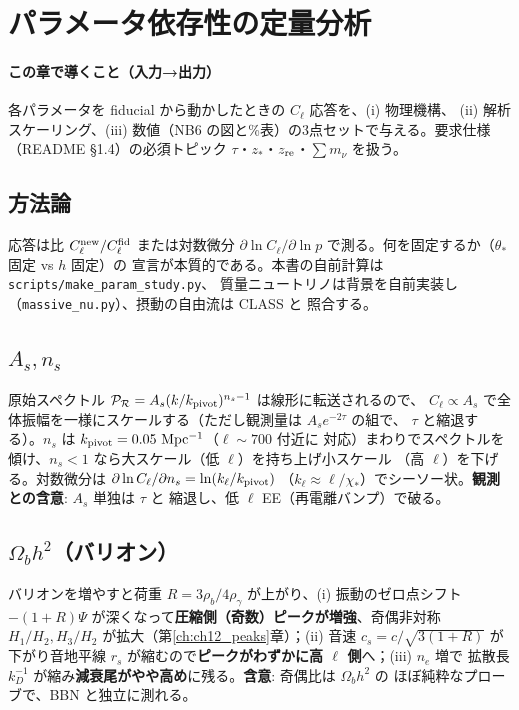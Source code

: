 \section{パラメータ依存性の定量分析}
\label{ch:ch13_params}

\paragraph{この章で導くこと（入力→出力）}
各パラメータを fiducial から動かしたときの $C_\ell$ 応答を、(i) 物理機構、
(ii) 解析スケーリング、(iii) 数値（NB6 の図と\%表）の3点セットで与える。要求仕様
（README §1.4）の必須トピック $\tau$・$z_*$・$z_{\rm re}$・$\sum m_\nu$ を扱う。

\subsection{方法論}
応答は比 $C_\ell^{\rm new}/C_\ell^{\rm fid}$ または対数微分
$\partial\ln C_\ell/\partial\ln p$ で測る。何を固定するか（$\theta_*$ 固定 vs $h$ 固定）の
宣言が本質的である。本書の自前計算は \texttt{scripts/make\_param\_study.py}、
質量ニュートリノは背景を自前実装し（\texttt{massive\_nu.py}）、摂動の自由流は CLASS と
照合する。

\subsection{$A_s,n_s$}
原始スペクトル $\mathcal P_\mathcal R=A_s(k/k_{\rm pivot})^{n_s-1}$ は線形に転送されるので、
$C_\ell\propto A_s$ で全体振幅を一様にスケールする（ただし観測量は $A_se^{-2\tau}$ の組で、
$\tau$ と縮退する）。$n_s$ は $k_{\rm pivot}=0.05~\mathrm{Mpc^{-1}}$（$\ell\sim700$ 付近に
対応）まわりでスペクトルを傾け、$n_s<1$ なら大スケール（低 $\ell$）を持ち上げ小スケール
（高 $\ell$）を下げる。対数微分は $\partial\ln C_\ell/\partial n_s=\ln(k_\ell/k_{\rm pivot})$
（$k_\ell\approx\ell/\chi_*$）でシーソー状。\textbf{観測との含意}: $A_s$ 単独は $\tau$ と
縮退し、低 $\ell$ EE（再電離バンプ）で破る。

\subsection{$\Omega_bh^2$（バリオン）}
バリオンを増やすと荷重 $R=3\rho_b/4\rho_\gamma$ が上がり、(i) 振動のゼロ点シフト
$-(1+R)\Psi$ が深くなって\textbf{圧縮側（奇数）ピークが増強}、奇偶非対称
$H_1/H_2,H_3/H_2$ が拡大（第\ref{ch:ch12_peaks}章）；(ii) 音速 $c_s=c/\sqrt{3(1+R)}$ が
下がり音地平線 $r_s$ が縮むので\textbf{ピークがわずかに高 $\ell$ 側}へ；(iii) $n_e$ 増で
拡散長 $k_D^{-1}$ が縮み\textbf{減衰尾がやや高め}に残る。\textbf{含意}: 奇偶比は $\Omega_bh^2$ の
ほぼ純粋なプローブで、BBN と独立に測れる。

